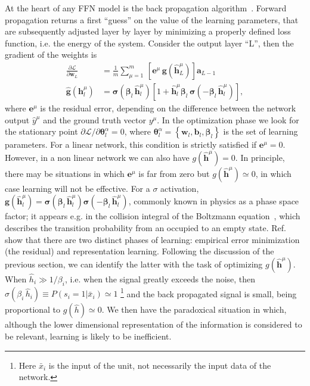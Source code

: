 \documentclass[5p]{elsarticle}
\begin{document}
At the heart of any FFN model is the back propagation algorithm~\cite{hertz, bishop}. Forward propagation returns a first ``guess'' on the value of the learning parameters, that are subsequently adjusted layer by layer by minimizing a properly defined loss function, i.e. the energy of the system. Consider the output layer ``L'', then the gradient of the weights is
%
\begin{align} \label{eq:gradsL}
\frac{\partial \mathscr{L}}{\partial \mathbf{w}_L } &=  \frac{1}{m} \sum_{\mu=1}^m \, \left[ \mathbf{e}^{\mu} \, \mathbf{g}(\hat{\mathbf{h}}^{\mu} _L) \right]  \mathbf{a}_{L-1}  \\ \nonumber
\hat{\mathbf{g}}(\mathbf{h}^{\mu}_l) &=  \boldsymbol{\sigma}(\boldsymbol{\beta}_l \, \hat{\mathbf{h}}^{\mu}_l)[ 1 + \hat{\mathbf{h}}^{\mu}_l \boldsymbol{\beta}_l \, \boldsymbol{\sigma}(-\boldsymbol{\beta}_l \, \hat{\mathbf{h}}^{\mu}_l) ] ,
 \end{align}
%
where $\mathbf{e}^{\mu}$ is the residual error, depending on the difference between the network output $\hat{y}^{\mu} $ and the ground truth vector $y^{\mu}$. In the optimization phase we look for the stationary point  $\partial \mathscr{L}/\partial \boldsymbol{\theta}^{\alpha}_l=0$, where $\boldsymbol{\theta}^{\alpha}_l = \left\{ \mathbf{w}_l, \mathbf{b}_l, \boldsymbol{\beta}_l \right\} $ is the set of learning parameters. For a linear network, this condition is  strictly satisfied if $ \mathbf{e}^{\mu}=0$. However, in a non linear network we can also have $g(\hat{\mathbf{h}}^{\mu})=0$. In principle, there may be situations in which $\mathbf{e}^{\mu}$ is far from zero but $g(\hat{\mathbf{h}}^{\mu}) \simeq 0$, in which case learning will not be effective. For a $\sigma$ activation, $\mathbf{g}(\hat{\mathbf{h}}^{\mu}_l) = \boldsymbol{\sigma}(\boldsymbol{\beta}_l \, \hat{\mathbf{h}}^{\mu}_l)\boldsymbol{\sigma}(-\boldsymbol{\beta}_l \, \hat{\mathbf{h}}^{\mu}_l)$, commonly known in physics as a phase space factor; it appears e.g. in the collision integral of the Boltzmann equation~\cite{roberto}, which describes the transition probability from an occupied to an empty state. Ref.~\cite{tishby1, tishby2} show that there are two distinct phases of learning: empirical error minimization (the residual) and representation learning. Following the discussion of the previous section, we can identify the latter with the task of optimizing $g(\hat{\mathbf{h}}^{\mu})$. When $\hat{h}_i \gg 1/\beta_i$, i.e. when the signal greatly exceeds the noise, then $\sigma( \beta_i \,\hat{ h}_i) \equiv P(s_i=1| \bar{x}_i)  \simeq 1$ \footnote{ Here $\bar{x}_i$ is the input of the unit, not necessarily the input data of the network.} and the back propagated signal is small, being proportional to $g(\hat{h} ) \simeq 0$. We then have the paradoxical situation in which, although the lower dimensional representation of the information is considered to be relevant, learning is likely to be inefficient.
\end{document}
